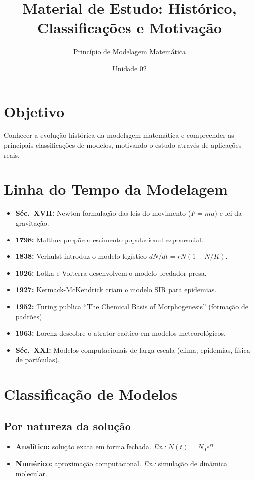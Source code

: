 \documentclass[12pt,a4paper]{article}
\title{Material de Estudo: Hist\'orico, Classifica\c{c}\~oes e Motiva\c{c}\~ao}
\author{Princ\'ipio de Modelagem Matem\'atica}
\date{Unidade 02}
\begin{document}
\maketitle

\section*{Objetivo}
Conhecer a evolu\c{c}\~ao hist\'orica da modelagem matem\'atica e compreender as principais classifica\c{c}\~oes de modelos, motivando o estudo atrav\'es de aplica\c{c}\~oes reais.

\section*{Linha do Tempo da Modelagem}
\begin{itemize}
  \item \textbf{S\'ec.\ XVII:} Newton formula\c{c}\~ao das leis do movimento ($F=ma$) e lei da gravita\c{c}\~ao.
  \item \textbf{1798:} Malthus prop\~oe crescimento populacional exponencial.
  \item \textbf{1838:} Verhulst introduz o modelo log\'istico $dN/dt = rN(1-N/K)$.
  \item \textbf{1926:} Lotka e Volterra desenvolvem o modelo predador-presa.
  \item \textbf{1927:} Kermack-McKendrick criam o modelo SIR para epidemias.
  \item \textbf{1952:} Turing publica ``The Chemical Basis of Morphogenesis'' (forma\c{c}\~ao de padr\~oes).
  \item \textbf{1963:} Lorenz descobre o atrator ca\'otico em modelos meteorol\'ogicos.
  \item \textbf{S\'ec.\ XXI:} Modelos computacionais de larga escala (clima, epidemias, f\'isica de part\'iculas).
\end{itemize}

\section*{Classifica\c{c}\~ao de Modelos}
\subsection*{Por natureza da solu\c{c}\~ao}
\begin{itemize}
  \item \textbf{Anal\'itico:} solu\c{c}\~ao exata em forma fechada. \textit{Ex.:} $N(t)=N_0 e^{rt}$.
  \item \textbf{Num\'erico:} aproxima\c{c}\~ao computacional. \textit{Ex.:} simula\c{c}\~ao de din\^amica molecular.
\end{itemize}
\end{document}
